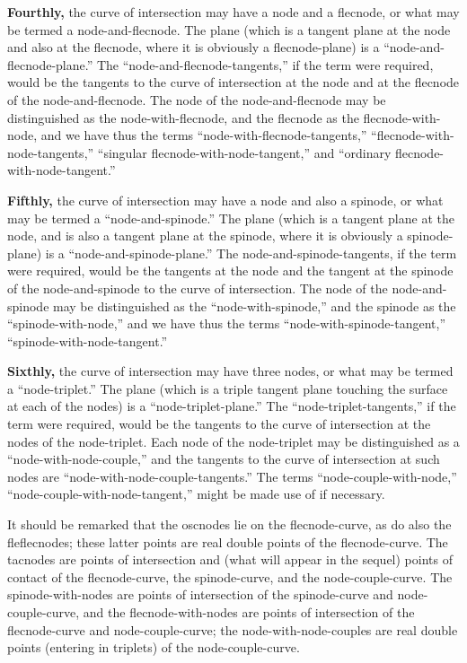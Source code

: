 \documentclass[11pt,a4paper]{article}
\theoremstyle{plain}
\begin{document}
\textbf{Fourthly,} the curve of intersection may have a node and a flecnode, or what may be termed a node-and-flecnode. The plane (which is a tangent plane at the node and also at the flecnode, where it is obviously a flecnode-plane) is a ``node-and-flecnode-plane.'' The ``node-and-flecnode-tangents,'' if the term were required, would be the tangents to the curve of intersection at the node and at the flecnode of the node-and-flecnode. The node of the node-and-flecnode may be distinguished as the node-with-flecnode, and the flecnode as the flecnode-with-node, and we have thus the terms ``node-with-flecnode-tangents,'' ``flecnode-with-node-tangents,'' ``singular flecnode-with-node-tangent,'' and ``ordinary flecnode-with-node-tangent.''

\textbf{Fifthly,} the curve of intersection may have a node and also a spinode, or what may be termed a ``node-and-spinode.'' The plane (which is a tangent plane at the node, and is also a tangent plane at the spinode, where it is obviously a spinode-plane) is a ``node-and-spinode-plane.'' The node-and-spinode-tangents, if the term were required, would be the tangents at the node and the tangent at the spinode of the node-and-spinode to the curve of intersection. The node of the node-and-spinode may be distinguished as the ``node-with-spinode,'' and the spinode as the ``spinode-with-node,'' and we have thus the terms ``node-with-spinode-tangent,'' ``spinode-with-node-tangent.''

\textbf{Sixthly,} the curve of intersection may have three nodes, or what may be termed a ``node-triplet.'' The plane (which is a triple tangent plane touching the surface at each of the nodes) is a ``node-triplet-plane.'' The ``node-triplet-tangents,'' if the term were required, would be the tangents to the curve of intersection at the nodes of the node-triplet. Each node of the node-triplet may be distinguished as a ``node-with-node-couple,'' and the tangents to the curve of intersection at such nodes are ``node-with-node-couple-tangents.'' The terms ``node-couple-with-node,'' ``node-couple-with-node-tangent,'' might be made use of if necessary.

It should be remarked that the oscnodes lie on the flecnode-curve, as do also the fleflecnodes; these latter points are real double points of the flecnode-curve. The tacnodes are points of intersection and (what will appear in the sequel) points of contact of the flecnode-curve, the spinode-curve, and the node-couple-curve. The spinode-with-nodes are points of intersection of the spinode-curve and node-couple-curve, and the flecnode-with-nodes are points of intersection of the flecnode-curve and node-couple-curve; the node-with-node-couples are real double points (entering in triplets) of the node-couple-curve.
\end{document}
